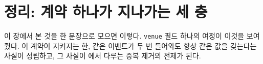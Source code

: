 \section{정리: 계약 하나가 지나가는 세 층}
\label{sec:contract-summary}

이 장에서 본 것을 한 문장으로 모으면 이렇다.  \texttt{venue} 필드
하나의 여정이 이것을 보여 줬다. 이 계약이 지켜지는 한, 같은 이벤트가 두 번
들어와도 항상 같은 값을 갖는다는 사실이 성립하고, 그 사실이
에서 다루는 중복 제거의 전제가 된다.
